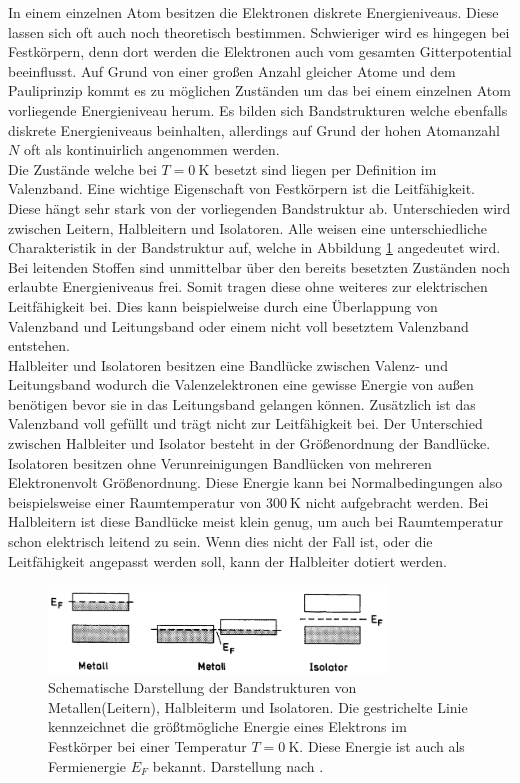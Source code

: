 In einem einzelnen Atom besitzen die Elektronen diskrete Energieniveaus. Diese lassen sich oft auch noch theoretisch bestimmen. Schwieriger wird es hingegen bei Festkörpern,
denn dort werden die Elektronen auch vom gesamten Gitterpotential beeinflusst. Auf Grund von einer großen Anzahl gleicher Atome und dem Pauliprinzip kommt es zu möglichen
Zuständen um das bei einem einzelnen Atom vorliegende Energieniveau herum. Es bilden sich Bandstrukturen welche ebenfalls diskrete Energieniveaus beinhalten, allerdings auf Grund
der hohen Atomanzahl $N$ oft als kontinuirlich angenommen werden. 
\\
Die Zustände welche bei $T = \SI{0}{\kelvin}$ besetzt sind liegen per Definition im Valenzband. Eine wichtige Eigenschaft von Festkörpern ist die Leitfähigkeit. Diese
hängt sehr stark von der vorliegenden Bandstruktur ab. Unterschieden wird zwischen Leitern, Halbleitern und Isolatoren. Alle weisen eine unterschiedliche Charakteristik in der
Bandstruktur auf, welche in Abbildung \ref{fig:bandstruktur} angedeutet wird.
\\
Bei leitenden Stoffen sind unmittelbar über den bereits besetzten Zuständen noch erlaubte Energieniveaus frei. Somit tragen diese ohne weiteres zur elektrischen Leitfähigkeit bei.
Dies kann beispielweise durch eine Überlappung von Valenzband und Leitungsband oder einem nicht voll besetztem Valenzband entstehen.
\\
Halbleiter und Isolatoren besitzen eine Bandlücke zwischen Valenz- und Leitungsband wodurch die Valenzelektronen eine gewisse Energie von außen benötigen bevor sie in das Leitungsband gelangen können.
Zusätzlich ist das Valenzband voll gefüllt und trägt nicht zur Leitfähigkeit bei. Der Unterschied zwischen Halbleiter und Isolator besteht in der Größenordnung der Bandlücke. 
Isolatoren besitzen ohne Verunreinigungen Bandlücken von mehreren Elektronenvolt Größenordnung. Diese Energie kann bei Normalbedingungen also beispielsweise einer Raumtemperatur von $\SI{300}{\kelvin}$ 
nicht aufgebracht werden. Bei Halbleitern ist diese Bandlücke meist klein genug, um auch bei Raumtemperatur schon elektrisch leitend zu sein. 
Wenn dies nicht der Fall ist, oder die Leitfähigkeit angepasst werden soll, kann der Halbleiter dotiert werden.
\begin{figure}
    \centering
    \includegraphics[width=0.8\textwidth]{bilder/bandstruktur.png}    
    \caption{Schematische Darstellung der Bandstrukturen von Metallen(Leitern), Halbleiterm und Isolatoren. Die gestrichelte Linie kennzeichnet die größtmögliche Energie eines Elektrons im Festkörper bei einer Temperatur $T = \SI{0}{\kelvin}$. 
    Diese Energie ist auch als Fermienergie $E_F$ bekannt. Darstellung nach \cite{Kopitzki2017}.}
    \label{fig:bandstruktur}
\end{figure}

